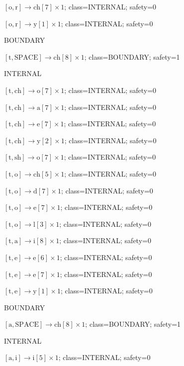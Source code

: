 \(\left[\mathrm{o}, \mathrm{r}\right] \to \mathrm{ch}[7] \times 1\); class=INTERNAL; safety=0\par
\(\left[\mathrm{o}, \mathrm{r}\right] \to \mathrm{y}[1] \times 1\); class=INTERNAL; safety=0\par
BOUNDARY\par
\(\left[\mathrm{t}, \mathrm{SPACE}\right] \to \mathrm{ch}[8] \times 1\); class=BOUNDARY; safety=1\par
INTERNAL\par
\(\left[\mathrm{t}, \mathrm{ch}\right] \to \mathrm{o}[7] \times 1\); class=INTERNAL; safety=0\par
\(\left[\mathrm{t}, \mathrm{ch}\right] \to \mathrm{a}[7] \times 1\); class=INTERNAL; safety=0\par
\(\left[\mathrm{t}, \mathrm{ch}\right] \to \mathrm{e}[7] \times 1\); class=INTERNAL; safety=0\par
\(\left[\mathrm{t}, \mathrm{ch}\right] \to \mathrm{y}[2] \times 1\); class=INTERNAL; safety=0\par
\(\left[\mathrm{t}, \mathrm{sh}\right] \to \mathrm{o}[7] \times 1\); class=INTERNAL; safety=0\par
\(\left[\mathrm{t}, \mathrm{o}\right] \to \mathrm{ch}[5] \times 1\); class=INTERNAL; safety=0\par
\(\left[\mathrm{t}, \mathrm{o}\right] \to \mathrm{d}[7] \times 1\); class=INTERNAL; safety=0\par
\(\left[\mathrm{t}, \mathrm{o}\right] \to \mathrm{e}[7] \times 1\); class=INTERNAL; safety=0\par
\(\left[\mathrm{t}, \mathrm{o}\right] \to \mathrm{l}[3] \times 1\); class=INTERNAL; safety=0\par
\(\left[\mathrm{t}, \mathrm{a}\right] \to \mathrm{i}[8] \times 1\); class=INTERNAL; safety=0\par
\(\left[\mathrm{t}, \mathrm{e}\right] \to \mathrm{e}[6] \times 1\); class=INTERNAL; safety=0\par
\(\left[\mathrm{t}, \mathrm{e}\right] \to \mathrm{e}[7] \times 1\); class=INTERNAL; safety=0\par
\(\left[\mathrm{t}, \mathrm{e}\right] \to \mathrm{y}[1] \times 1\); class=INTERNAL; safety=0\par
BOUNDARY\par
\(\left[\mathrm{a}, \mathrm{SPACE}\right] \to \mathrm{ch}[8] \times 1\); class=BOUNDARY; safety=1\par
INTERNAL\par
\(\left[\mathrm{a}, \mathrm{i}\right] \to \mathrm{i}[5] \times 1\); class=INTERNAL; safety=0\par

